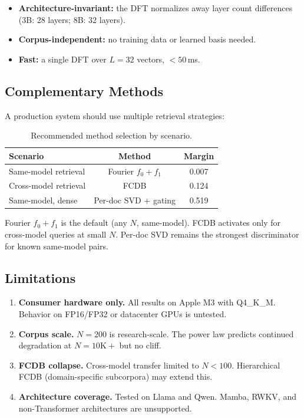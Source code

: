 \documentclass[11pt,twocolumn]{article}
\newcommand{\fcdb}{\textsc{FCDB}}
\begin{document}
\begin{itemize}[leftmargin=*,itemsep=1pt]
\item \textbf{Architecture-invariant:} the DFT normalizes away layer
  count differences (3B: 28 layers; 8B: 32 layers).
\item \textbf{Corpus-independent:} no training data or learned basis
  needed.
\item \textbf{Fast:} a single DFT over $L{=}32$ vectors, $<50$\,ms.
\end{itemize}

\subsection{Complementary Methods}

A production system should use multiple retrieval strategies:

\begin{table}[t]
\centering
\caption{Recommended method selection by scenario.}
\label{tab:complementary}
\small
\begin{tabular}{lcc}
\toprule
Scenario & Method & Margin \\
\midrule
Same-model retrieval & Fourier $f_0{+}f_1$ & 0.007 \\
Cross-model retrieval & \fcdb{} & 0.124 \\
Same-model, dense & Per-doc SVD + gating & 0.519 \\
\bottomrule
\end{tabular}
\end{table}

Fourier $f_0{+}f_1$ is the default (any $N$, same-model). \fcdb{}
activates only for cross-model queries at small $N$. Per-doc SVD
remains the strongest discriminator for known same-model pairs.

\subsection{Limitations}

\begin{enumerate}[leftmargin=*,itemsep=1pt]
\item \textbf{Consumer hardware only.} All results on Apple M3 with
  Q4\_K\_M. Behavior on FP16/FP32 or datacenter GPUs is untested.
\item \textbf{Corpus scale.} $N{=}200$ is research-scale. The power law
  predicts continued degradation at $N{=}10\text{K}+$ but no cliff.
\item \textbf{\fcdb{} collapse.} Cross-model transfer limited to
  $N < 100$. Hierarchical \fcdb{} (domain-specific subcorpora) may
  extend this.
\item \textbf{Architecture coverage.} Tested on Llama and Qwen. Mamba,
  RWKV, and non-Transformer architectures are unsupported.
\end{enumerate}
\end{document}
